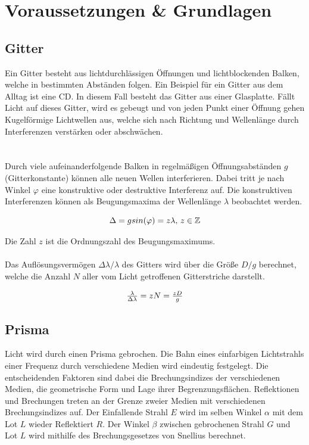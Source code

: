 \documentclass[12pt,a4paper,twoside]{article}
\begin{document}
\section{Voraussetzungen \& Grundlagen} %
\subsection{Gitter}
Ein Gitter besteht aus lichtdurchlässigen Öffnungen und lichtblockenden Balken, welche in bestimmten Abständen folgen. Ein Beispiel für ein Gitter aus dem Alltag ist eine CD. 
In diesem Fall besteht das Gitter aus einer Glasplatte. Fällt Licht auf dieses Gitter, wird es gebeugt und von jeden Punkt einer Öffnung gehen Kugelförmige Lichtwellen aus, welche sich nach Richtung und Wellenlänge durch Interferenzen verstärken oder abschwächen. 
\\
\\
\\
Durch viele aufeinanderfolgende Balken in regelmäßigen Öffnungsabständen $g$ (Gitterkonstante) können alle neuen Wellen interferieren. Dabei tritt je nach Winkel $\varphi$ eine konstruktive oder destruktive Interferenz auf. 
Die konstruktiven Interferenzen können als Beugungsmaxima der Wellenlänge $\lambda$ beobachtet werden. 

    \begin{equation}
        \label{eq:Gitterkonstante}
        \centerline{$\Delta=g sin(\varphi) = z\lambda$,     $z \in \mathbb{Z} $}
    \end{equation}

\noindent
Die Zahl $z$ ist die Ordnungszahl des Beugungsmaximums. 
\\
\\
Das Auflösungsvermögen $\Delta \lambda / \lambda$ des Gitters wird über die Größe $D/g$ berechnet, welche die Anzahl $N$ aller vom Licht getroffenen Gitterstriche darstellt.  

\begin{equation}
    \label{eq:Auflösungsvermögen}
    \centerline{$\frac{\lambda}{\Delta \lambda} = zN = \frac{zD}{g}$}
\end{equation}

\subsection{Prisma}
Licht wird durch einen Prisma gebrochen. 
Die Bahn eines einfarbigen Lichtstrahls einer Frequenz durch verschiedene Medien wird eindeutig festgelegt. Die entscheidenden Faktoren sind dabei die Brechungsindizes der verschiedenen Medien, die geometrische Form und Lage ihrer Begrenzungsflächen. 
Reflektionen und Brechungen treten an der Grenze zweier Medien mit verschiedenen Brechungsindizes auf. Der Einfallende Strahl $E$ wird im selben Winkel $\alpha$ mit dem Lot $L$ wieder Reflektiert $R$. 
Der Winkel $\beta$ zwischen gebrochenen Strahl $G$ und Lot $L$ wird mithilfe des Brechungsgesetzes von Snellius berechnet. 
\end{document}
